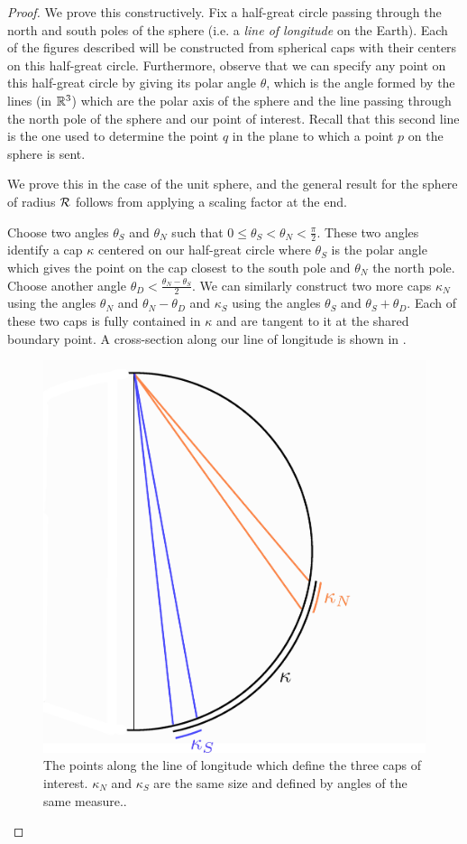 \begin{proof}


  We prove this constructively.  Fix a half-great circle passing through the north and south poles of the sphere (i.e. a \textit{line of longitude} on the Earth).  Each of the figures described will be constructed from spherical caps with their centers on this half-great circle.  Furthermore, observe that we can specify any point on this half-great circle by giving its polar angle $\theta$, which is the angle formed by the lines (in $\mathbb{R}^3$) which are the polar axis of the sphere and the line passing through the north pole of the sphere and our point of interest.  Recall that this second line is the one used to determine the point $q$ in the plane to which a point $p$ on the sphere is sent.
  
  
  We prove this in the case of the unit sphere, and the general result for the sphere of radius $\mathcal{R}$ follows from applying a scaling factor at the end.
  
  Choose two angles $\theta_S$ and $\theta_N$ such that $0\leq\theta_S<\theta_N<\tfrac{\pi}{2}$.  These two angles identify a cap $\kappa$ centered on our half-great circle where $\theta_S$ is the polar angle which gives the point on the cap closest to the south pole and $\theta_N$ the north pole.  Choose another angle $\theta_D <\tfrac{\theta_N-\theta_S}{2}$.  We can similarly construct two more caps $\kappa_N$ using the angles $\theta_N$ and $\theta_N - \theta_D$ and $\kappa_S$ using the angles $\theta_S$ and $\theta_S+\theta_D$.  Each of these two caps is fully contained in $\kappa$ and are tangent to it at the shared boundary point.  A cross-section along our line of longitude is shown in .
  
  
  \begin{figure}[h]
  	\centering
  	\includegraphics[width=.5\textwidth]{figs/reock_sph_schema.png}
  	\caption{The points along the line of longitude which define the three caps of interest.  $\kappa_N$ and $\kappa_S$ are the same size and defined by angles of the same measure..}
  	\label{fig:reock_sphere_schema}
  \end{figure}
  

\end{proof}
